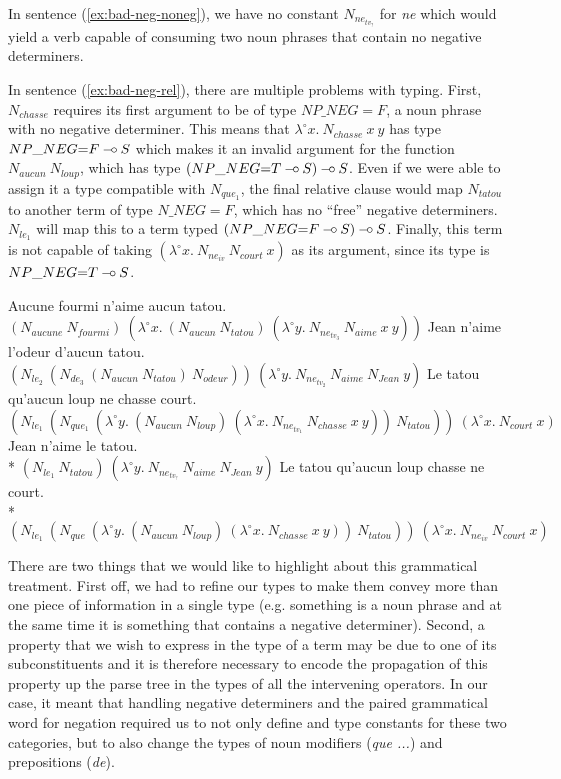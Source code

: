 In sentence (\ref{ex:bad-neg-noneg}), we have no constant
$N_{ne_{tv_?}}$ for \emph{ne} which would yield a verb capable of
consuming two noun phrases that contain no negative determiners.

In sentence (\ref{ex:bad-neg-rel}), there are multiple problems with
typing. First, $N_{chasse}$ requires its first argument to be of type
$NP\_NEG{=}F$, a noun phrase with no negative determiner. This means
that $\lambda^{\circ} x.\ N_{chasse}\ x\ y$ has type $NP\_NEG{=}F \mathbin{{-}\mkern-3.5mu{\circ}}
S$ which makes it an invalid argument for the function
$N_{aucun}\ N_{loup}$, which has type $(NP\_NEG{=}T \mathbin{{-}\mkern-3.5mu{\circ}} S) \mathbin{{-}\mkern-3.5mu{\circ}}
S$. Even if we were able to assign it a type compatible with
$N_{que_1}$, the final relative clause would map $N_{tatou}$ to another
term of type $N\_NEG{=}F$, which has no ``free'' negative
determiners. $N_{le_1}$ will map this to a term typed $(NP\_NEG{=}F
\mathbin{{-}\mkern-3.5mu{\circ}} S) \mathbin{{-}\mkern-3.5mu{\circ}} S$. Finally, this term is not capable of taking
$(\lambda^{\circ} x.\ N_{ne_{iv}}\ N_{court}\ x)$ as its argument, since
its type is $NP\_NEG{=}T \mathbin{{-}\mkern-3.5mu{\circ}} S$.

\begin{exe}
  \ex \label{ex:good-neg-double} Aucune fourmi n'aime aucun tatou. \\
      $(N_{aucune}\ N_{fourmi})\ (\lambda^{\circ} x.\ (N_{aucun}\ N_{tatou})\ (\lambda^{\circ} y.\ N_{ne_{tv_3}}\ N_{aime}\ x\ y))$
  \ex \label{ex:good-neg-embed} Jean n'aime l'odeur d'aucun tatou. \\
      $(N_{le_2}\ (N_{de_3}\ (N_{aucun}\ N_{tatou})\ N_{odeur}))\ (\lambda^{\circ} y.\ N_{ne_{tv_2}}\ N_{aime}\ N_{Jean}\ y)$
  \ex \label{ex:good-neg-rel} Le tatou qu'aucun loup ne chasse court. \\
      $(N_{le_1}\ (N_{que_1}\ (\lambda^{\circ} y.\ (N_{aucun}\ N_{loup})\ (\lambda^{\circ} x.\ N_{ne_{tv_1}}\ N_{chasse}\ x\ y))\ N_{tatou}))\ (\lambda^{\circ} x.\ N_{court}\ x)$
  \ex * \label{ex:bad-neg-noneg} Jean n'aime le tatou. \\
      * $(N_{le_1}\ N_{tatou})\ (\lambda^{\circ} y.\ N_{ne_{tv_?}}\ N_{aime}\ N_{Jean}\ y)$
  \ex * \label{ex:bad-neg-rel} Le tatou qu'aucun loup chasse ne court. \\
      * $(N_{le_1}\ (N_{que}\ (\lambda^{\circ} y.\ (N_{aucun}\ N_{loup})\ (\lambda^{\circ} x.\ N_{chasse}\ x\ y))\ N_{tatou}))\ (\lambda^{\circ} x.\ N_{ne_{iv}}\ N_{court}\ x)$
\end{exe}

There are two things that we would like to highlight about this
grammatical treatment. First off, we had to refine our types to make
them convey more than one piece of information in a single type
(e.g. something is a noun phrase and at the same time it is something
that contains a negative determiner). Second, a property that we wish to
express in the type of a term may be due to one of its subconstituents
and it is therefore necessary to encode the propagation of this property
up the parse tree in the types of all the intervening operators. In our
case, it meant that handling negative determiners and the paired
grammatical word for negation required us to not only define and type
constants for these two categories, but to also change the types of noun
modifiers (\emph{que ...}) and prepositions (\emph{de}).


